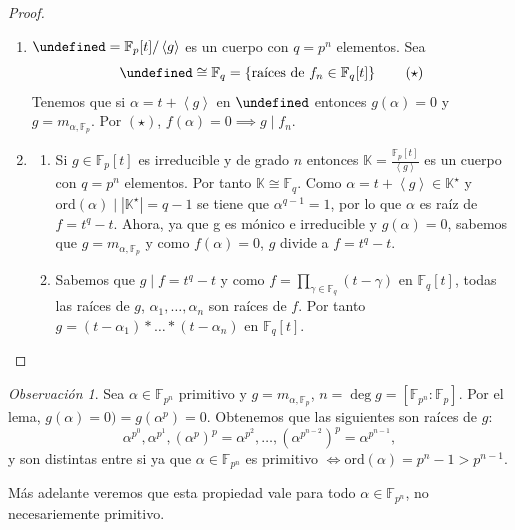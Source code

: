 \documentclass[10pt, spanish]{report}
\theoremstyle{definition}
\theoremstyle{custom}
\theoremstyle{remark}
\newtheorem*{obs}{Observación}
\newcommand{\F}{\mathbb{F}}
\newcommand{\K}{\mathbb{K}}
\let\L\undefined
\newcommand{\L}{\mathbb{L}}
\newcommand{\ord}[1]{\text{ord}(#1)}
\newcommand{\fecha}[1]{\marginpar{\underline{\footnotesize{#1}}}}
\begin{document}
\begin{proof}\hspace{0pt}
    \begin{enumerate}
        \item  $\L=\F_p[t]/\left<g\right>$  es un cuerpo con $q=p^n$ elementos.
            Sea
            \begin{equation}
                \L\cong\F_q=\left\{ \text{raíces de }f_n\in\F_q[t]\right\}
                \tag{$\star$}
            \end{equation}
            Tenemos que si $\alpha=t+\left< g \right> $ en $\L$ entonces
            $g(\alpha)=0$ y $g=m_{\alpha,\F_p}$. Por $\left( \star \right)$,
            $f(\alpha)=0\implies g\mid f_n$.
        \item
            \begin{enumerate}
                \item Si $g\in\F_p[t]$ es irreducible y de grado $n$ entonces $\K=
                    \frac{\F_p[t]}{\left< g \right>}$ es un cuerpo con $q=p^n$
                    elementos. Por tanto $\K\cong\F_q$.
                    Como $\alpha=t+\left< g \right>\in\K^\star$ y
                    $\ord{\alpha}\mid\left| \K^\star\right|=q-1$ se tiene que
                    $\alpha^{q-1}=1$, por lo que $\alpha$ es raíz de $f=t^q-t$.
                    Ahora, ya que g es mónico e irreducible y $g(\alpha)=0$,
                    sabemos que $g=m_{\alpha,\F_p}$ y como $f(\alpha)=0$, $g$
                    divide a $f=t^q-t$.
                \item Sabemos que $g\mid f=t^q-t$ y como $f=\prod_{\gamma\in\F_q}(t-\gamma)$ en $\F_q[t]$,
                    todas las raíces de $g$, $\alpha_1,\ldots,\alpha_n$ son
                    raíces de $f$. Por tanto
                    $g=(t-\alpha_1)*\ldots*(t-\alpha_n)$ en $\F_q[t]$.
            \end{enumerate}
    \end{enumerate}
    \vspace{-1.75em}
\end{proof}

\fecha{18/03}
\begin{obs}
    Sea $\alpha\in\F_{p^n}$ primitivo y $g=m_{\alpha,\F_p}$, $n=\deg{g}=\left[
    \F_{p^n}:\F_p\right]$. Por el lema, $g(\alpha)=0)=g(\alpha^p)=0$. Obtenemos
    que las siguientes son raíces de $g$: \[\alpha^{p^0},\alpha^{p^1},(\alpha^p)^p=
    \alpha^{p^2},\ldots,\left(\alpha^{p^{n-2}}\right)^p=\alpha^{p^{n-1}},\]
    y son distintas entre si ya que $\alpha\in\F_{p^{n}}$ es primitivo
    $\Leftrightarrow \ord{\alpha}=p^n-1>p^{n-1}$.

    Más adelante veremos que esta propiedad vale para todo $\alpha\in\F_{p^n}$,
    no necesariemente primitivo.
\end{obs}
\end{document}
